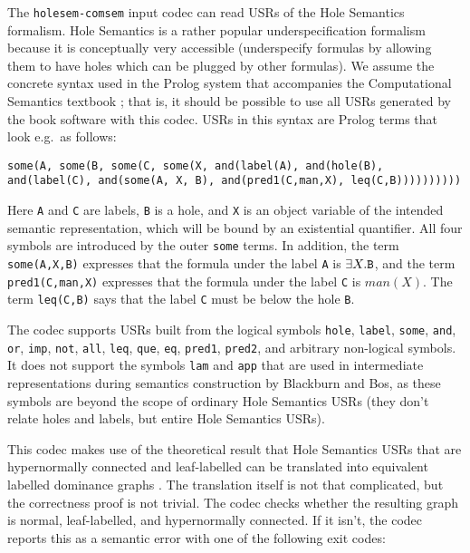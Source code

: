 The \verb?holesem-comsem? input codec can read USRs of the Hole
Semantics formalism. Hole Semantics \cite{Bos96} is a rather popular
underspecification formalism because it is conceptually very
accessible (underspecify formulas by allowing them to have holes which
can be plugged by other formulas). We assume the concrete syntax used
in the Prolog system that accompanies the Computational Semantics
textbook \cite{blackburn05:_repres_infer_natur_languag}; that is, it
should be possible to use all USRs generated by the book software with
this codec. USRs in this syntax are Prolog terms that look e.g.\ as
follows:

\begin{verbatim}
some(A, some(B, some(C, some(X, and(label(A), and(hole(B),
and(label(C), and(some(A, X, B), and(pred1(C,man,X), leq(C,B))))))))))
\end{verbatim}

Here \verb?A? and \verb?C? are labels, \verb?B? is a hole, and
\verb?X? is an object variable of the intended semantic
representation, which will be bound by an existential quantifier. All
four symbols are introduced by the outer \verb?some? terms. In
addition, the term \verb?some(A,X,B)? expresses that the formula under
the label \verb?A? is $\exists X. \verb?B?$, and the term
\verb?pred1(C,man,X)? expresses that the formula under the label
\verb?C? is $man(X)$. The term \verb?leq(C,B)? says that the label
\verb?C? must be below the hole \verb?B?.

The codec supports USRs built from the logical symbols \verb?hole?,
\verb?label?, \verb?some?, \verb?and?, \verb?or?, \verb?imp?,
\verb?not?, \verb?all?, \verb?leq?, \verb?que?, \verb?eq?,
\verb?pred1?, \verb?pred2?, and arbitrary non-logical symbols. It does
not support the symbols \verb?lam? and \verb?app? that are used in
intermediate representations during semantics construction by
Blackburn and Bos, as these symbols are beyond the scope of ordinary
Hole Semantics USRs (they don't relate holes and labels, but entire
Hole Semantics USRs).

This codec makes use of the theoretical result that Hole Semantics
USRs that are hypernormally connected and leaf-labelled can be
translated into equivalent labelled dominance graphs
\cite{KolNieTha03}. The translation itself is not that complicated,
but the correctness proof is not trivial. The codec checks whether the
resulting graph is normal, leaf-labelled, and hypernormally
connected. If it isn't, the codec reports this as a semantic error
with one of the following exit codes:

